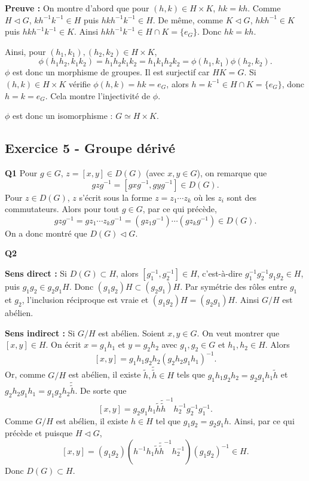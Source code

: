 \documentclass[11pt,a4paper]{article}
\newcommand{\normal}{\mathrel{\triangleleft}}
\begin{document}
\textbf{Preuve :} On montre d'abord que pour $(h,k)\in H\times K$, $hk=kh$. Comme $H\normal G$, $kh^{-1}k^{-1}\in H$ puis $hkh^{-1}k^{-1}\in H$. De même, comme $K\normal G$, $hkh^{-1}\in K$ puis $hkh^{-1}k^{-1}\in K$. Ainsi $hkh^{-1}k^{-1}\in H\cap K=\{e_G\}$. Donc $hk=kh$.

Ainsi, pour $(h_1,k_1),(h_2,k_2)\in H\times K$,
\[
\phi(h_1h_2,k_1k_2)=h_1h_2k_1k_2=h_1k_1h_2k_2=\phi(h_1,k_1)\phi(h_2,k_2).
\]
$\phi$ est donc un morphisme de groupes. Il est surjectif car $HK=G$. Si $(h,k)\in H\times K$ vérifie $\phi(h,k)=hk=e_G$, alors $h=k^{-1}\in H\cap K=\{e_G\}$, donc $h=k=e_G$. Cela montre l'injectivité de $\phi$.

$\phi$ est donc un isomorphisme : $G\simeq H\times K$.

\subsection*{Exercice 5 - Groupe dérivé}
\textbf{Q1} Pour $g\in G$, $z=[x,y]\in D(G)$ (avec $x,y\in G$), on remarque que
\[
gzg^{-1}=[gxg^{-1},gyg^{-1}]\in D(G).
\]
Pour $z\in D(G)$, $z$ s'écrit sous la forme $z=z_1\cdots z_k$ où les $z_i$ sont des commutateurs. Alors pour tout $g\in G$, par ce qui précède,
\[
gzg^{-1}=gz_1\cdots z_kg^{-1}=(gz_1g^{-1})\cdots(gz_kg^{-1})\in D(G).
\]
On a donc montré que $D(G)\normal G$.

\textbf{Q2}

\textbf{Sens direct :} Si $D(G)\subset H$, alors $[g_1^{-1},g_2^{-1}]\in H$, c'est-à-dire $g_1^{-1}g_2^{-1}g_1g_2\in H$, puis $g_1g_2\in g_2g_1H$. Donc $(g_1g_2)H\subset(g_2g_1)H$. Par symétrie des rôles entre $g_1$ et $g_2$, l'inclusion réciproque est vraie et $(g_1g_2)H=(g_2g_1)H$. Ainsi $G/H$ est abélien.

\textbf{Sens indirect :} Si $G/H$ est abélien. Soient $x,y\in G$. On veut montrer que $[x,y]\in H$. On écrit $x=g_1h_1$ et $y=g_2h_2$ avec $g_1,g_2\in G$ et $h_1,h_2\in H$. Alors
\[
[x,y]=g_1h_1g_2h_2(g_2h_2g_1h_1)^{-1}.
\]
Or, comme $G/H$ est abélien, il existe $\widetilde h,\widetilde{\widetilde h}\in H$ tels que $g_1h_1g_2h_2=g_2g_1h_1\widetilde h$ et $g_2h_2g_1h_1=g_1g_2h_2\widetilde{\widetilde h}$. De sorte que
\[
[x,y]=g_2g_1h_1\widetilde h\widetilde{\widetilde h}^{-1}h_2^{-1}g_2^{-1}g_1^{-1}.
\]
Comme $G/H$ est abélien, il existe $h\in H$ tel que $g_1g_2=g_2g_1h$. Ainsi, par ce qui précède et puisque $H\normal G$,
\[
[x,y]=(g_1g_2)(h^{-1}h_1\widetilde h\widetilde{\widetilde h}^{-1}h_2^{-1})(g_1g_2)^{-1}\in H.
\]
Donc $D(G)\subset H$.
\end{document}
